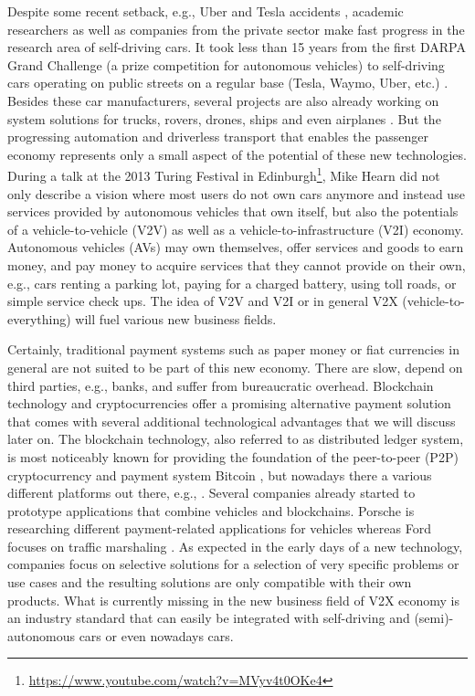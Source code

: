 \documentclass{llncs}
\begin{document}
{		Despite some recent setback, e.g., Uber and Tesla accidents \cite{teslaAccident}\cite{uberAccident}, academic researchers as well as companies from the private sector make fast progress in the research area of self-driving cars. It took less than 15 years from the first DARPA Grand Challenge (a prize competition for autonomous vehicles) to self-driving cars operating on public streets on a regular base (Tesla, Waymo, Uber, etc.) \cite{carStatistics}\cite{carsCalifornia}. Besides these car manufacturers, several projects are also already working on system solutions for trucks, rovers, drones, ships and even airplanes \cite{davWhitepaper}\cite{levander2017autonomous}\cite{trosterer2017transport}. But the progressing automation and driverless transport that enables the passenger economy represents only a small aspect of the potential of these new technologies. During a talk at the 2013 Turing Festival in Edinburgh\footnote{\url{https://www.youtube.com/watch?v=MVyv4t0OKe4}}, Mike Hearn did not only describe a vision where most users do not own cars anymore and instead use services provided by autonomous vehicles that own itself, but also the potentials of a vehicle-to-vehicle (V2V) as well as a vehicle-to-infrastructure (V2I) economy. Autonomous vehicles (AVs) may own themselves, offer services and goods to earn money, and pay money to acquire services that they cannot provide on their own, e.g., cars renting a parking lot, paying for a charged battery, using toll roads, or simple service check ups. The idea of V2V and V2I or in general V2X (vehicle-to-everything) will fuel various new business fields. 
		
		Certainly, traditional payment systems such as paper money or fiat currencies in general are not suited to be part of this new economy. There are slow, depend on third parties, e.g., banks, and suffer from bureaucratic overhead. Blockchain technology and cryptocurrencies offer a promising alternative payment solution that comes with several additional technological advantages that we will discuss later on. The blockchain technology, also referred to as distributed ledger system, is most noticeably known for providing the foundation of the peer-to-peer (P2P) cryptocurrency and payment system Bitcoin \cite{nakamoto_bitcoin:2008}, but nowadays there a various different platforms out there, e.g., \cite{tezosWhitepaper}\cite{iotaWhitepaper}\cite{wood2014ethereum}. Several companies already started to prototype applications that combine vehicles and blockchains. Porsche is researching different payment-related applications for vehicles \cite{porscheBlockchain} whereas Ford focuses on traffic marshaling \cite{macneille2018vehicle}. As expected in the early days of a new technology, companies focus on selective solutions for a selection of very specific problems or use cases and the resulting solutions are only compatible with their own products. What is currently missing in the new business field of V2X economy is an industry standard that can easily be integrated with self-driving and (semi)-autonomous cars or even nowadays cars. 

}
\end{document}
